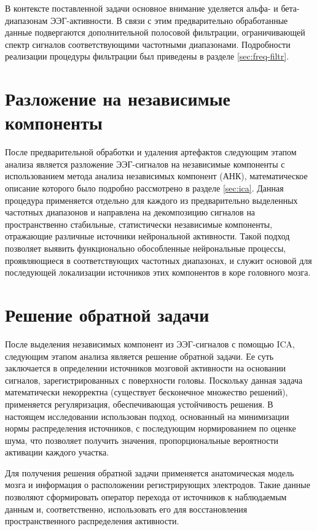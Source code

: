 В контексте поставленной задачи основное внимание уделяется альфа- и бета-диапазонам ЭЭГ-активности. В связи с этим предварительно обработанные данные подвергаются дополнительной полосовой фильтрации, ограничивающей спектр сигналов соответствующими частотными диапазонами. Подробности реализации процедуры фильтрации был приведены в разделе \ref{sec:freq-filtr}.


\section{Разложение на независимые компоненты}
После предварительной обработки и удаления артефактов следующим этапом анализа является разложение ЭЭГ-сигналов на независимые компоненты с использованием метода анализа независимых компонент (АНК), математическое описание которого было подробно рассмотрено в разделе \ref{sec:ica}. Данная процедура применяется отдельно для каждого из предварительно выделенных частотных диапазонов и направлена на декомпозицию сигналов на пространственно стабильные, статистически независимые компоненты, отражающие различные источники нейрональной активности. Такой подход позволяет выявить функционально обособленные нейрональные процессы, проявляющиеся в соответствующих частотных диапазонах, и служит основой для последующей локализации источников этих компонентов в коре головного мозга.

\section{Решение обратной задачи}

После выделения независимых компонент из ЭЭГ-сигналов с помощью ICA, следующим этапом анализа является решение обратной задачи. Ее суть заключается в определении источников мозговой активности на основании сигналов, зарегистрированных с поверхности головы. Поскольку данная задача математически некорректна (существует бесконечное множество решений), применяется регуляризация, обеспечивающая устойчивость решения. В настоящем исследовании использован подход, основанный на минимизации нормы распределения источников, с последующим нормированием по оценке шума, что позволяет получить значения, пропорциональные вероятности активации каждого участка.

Для получения решения обратной задачи применяется анатомическая модель мозга и информация о расположении регистрирующих электродов. Такие данные позволяют сформировать оператор перехода от источников к наблюдаемым данным и, соответственно, использовать его для восстановления пространственного распределения активности.

